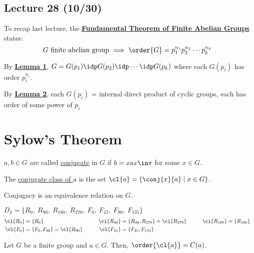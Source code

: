 \subsection*{Lecture 28 (10/30)} %

To recap last lecture, the \uline{\textbf{Fundamental Theorem of Finite Abelian Groups}} states:
\[\text{\(G\) finite abelian group \(\implies\) \(\order{G} = p_1^{n_1}p_2^{n_2}\cdots p_k^{n_k}\)}\]

By \uline{\textbf{Lemma 1}}, \(G = G(p_1) \idp G(p_2) \idp \cdots \idp G(p_k)\) where each \(G(p_i)\) has order \(p_i^{n_i}\).

By \uline{\textbf{Lemma 2}}, each \(G(p_i)\) = internal direct product of cyclic groups, each has order of some power of \(p_i\)

\setcounter{section}{23}
\section{Sylow's Theorem}

\begin{definition}

    \(a,b\in G\) are called \uline{conjugate} in \(G\) if \(b=xax\inv\) for some \(x\in G\).

    The \uline{conjugate class of \(a\)} is the set \(\cl{a} = \{\conj{x}{a} \mid x\in G\}\).
\end{definition}

\begin{remark}
    Conjugacy is an equivalence relation on \(G\).
\end{remark}

\begin{example}
    \(D_4 = \{ R_{0},\  R_{90},\  R_{180},\  R_{270},\  F_{0},\  F_{45},\ F_{90},\ F_{135} \}\)
    \begin{align*}
        \cl{R_{0}} &= \{R_{0}\} \qquad & \cl{R_{90}}&=\{R_{90}, R_{270}\} = \cl{R_{270}} \qquad & \cl{R_{180}} &= \{R_{180}\} \\
            \cl{F_{0}} &= \{F_{0}, F_{90}\} = \cl{R_{90}} \qquad & \cl{F_{45}} &= \{F_{45}, F_{135}\}
    \end{align*}
\end{example}

\begin{theorem}[24.1]
    Let \(G\) be a finite group and \(a\in G\). Then, \(\order{\cl{a}}=\index{G}{C(a)}\).
\end{theorem}

